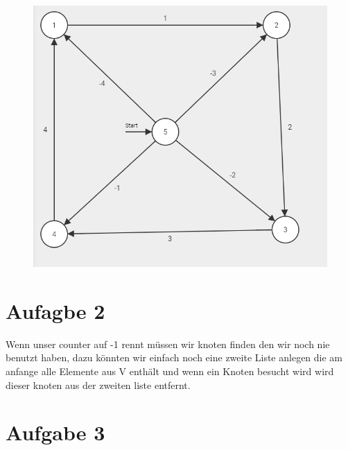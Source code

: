 \documentclass[a4paper]{article}
\begin{document}
\begin{figure}[htb]
\centering
\includegraphics[width=0.9\linewidth]{02.png}
\label{fig:name}
\end{figure}

\section{Aufagbe 2}
Wenn unser counter auf -1 rennt müssen wir knoten finden 
den wir noch nie benutzt haben, dazu könnten wir einfach 
noch eine zweite Liste anlegen die am anfange alle
Elemente aus V enthält und wenn ein Knoten besucht 
wird wird dieser knoten aus der zweiten liste entfernt.

\section{Aufgabe 3}
\end{document}
